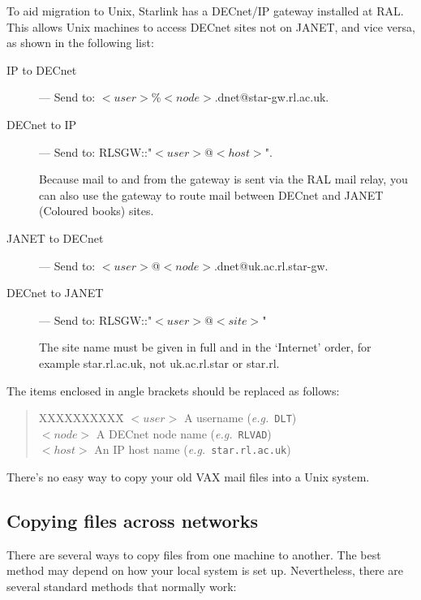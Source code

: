 To aid migration to Unix, Starlink has a DECnet/IP gateway installed at RAL.
This allows Unix machines to access DECnet sites not on JANET, and vice versa,
as shown in the following list:
\begin{description}
\begin{description}
\item [IP to DECnet] ---
Send to: $<user>$\%$<node>$.dnet@star-gw.rl.ac.uk.

\item [DECnet to IP] ---
Send to: RLSGW::"$<user>$@$<host>$".

Because mail to and from the gateway is sent via the RAL mail relay, you can
also use the gateway to route mail between DECnet and JANET (Coloured books)
sites. 

\item [JANET to DECnet] ---
Send to: $<user>$@$<node>$.dnet@uk.ac.rl.star-gw.

\item [DECnet to JANET] ---
Send to: RLSGW::"$<user>$@$<site>$"

The site name must be given in full and in the `Internet' order, for example
star.rl.ac.uk, not uk.ac.rl.star or star.rl.
\end{description}
\end{description}
The items enclosed in angle brackets should be replaced as follows:
\begin{quote}
\begin{tabbing}
XXXXXXXXXX\=\kill
$<user>$ \> A username ({\em e.g.}\, {\tt DLT})\\
$<node>$ \> A DECnet node name ({\em e.g.}\, {\tt RLVAD})\\
$<host>$ \> An IP host name ({\em e.g.}\, {\tt star.rl.ac.uk})
\end{tabbing}
\end{quote}

There's no easy way to copy your old VAX mail files into a Unix system.

\subsection{Copying files across networks}

There are several ways to copy files from one machine to another.
The best method may depend on how your local system is set up.
Nevertheless, there are several standard methods that normally work:

